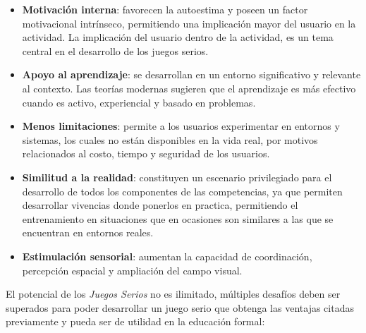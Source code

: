 \begin{itemize}

\item \textbf{Motivación interna}: favorecen la autoestima y poseen un factor
    motivacional intrínseco\cite{guenaga2013serious,martin2008modelo},
    permitiendo una implicación mayor del usuario en la
    actividad\cite{sg:aoverview}. La implicación del usuario dentro de la
    actividad, es un tema central en el desarrollo de los juegos
    serios\cite{charsky:2010}.

\item \textbf{Apoyo al aprendizaje}: se desarrollan en un entorno significativo
    y relevante al contexto\cite{sg:aoverview}. Las teorías modernas sugieren
    que el aprendizaje es más efectivo cuando es activo, experiencial y basado
    en problemas\cite{guenaga2013serious}.

\item \textbf{Menos limitaciones}: permite a los usuarios experimentar en
    entornos y sistemas, los cuales no están disponibles en la vida real, por
    motivos relacionados al costo, tiempo y seguridad de los
    usuarios\cite{sg:aoverview}.
    
\item \textbf{Similitud a la realidad}: constituyen un escenario privilegiado
    para el desarrollo de todos los componentes de las competencias, ya que
    permiten desarrollar vivencias donde ponerlos en practica, permitiendo el
    entrenamiento en situaciones que en ocasiones son similares a las que se
    encuentran en entornos reales\cite{guenaga2013serious,sg:aoverview}.
    
\item \textbf{Estimulación sensorial}: aumentan la capacidad de coordinación,
    percepción espacial y ampliación del campo visual\cite{guenaga2013serious}. 

\end{itemize}

El potencial de los \emph{Juegos Serios} no es ilimitado, múltiples desafíos
deben ser superados para poder desarrollar un juego serio que obtenga las
ventajas citadas previamente y pueda ser de utilidad en la educación formal:



